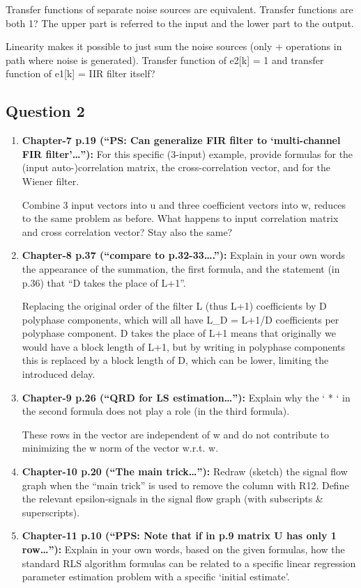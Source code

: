 \documentclass[
  a4paper,
  ,captions=tableheading
]{scrartcl}
\begin{document}
\begin{enumerate}
  Transfer functions of separate noise sources are equivalent. Transfer
  functions are both 1? The upper part is referred to the input and the
  lower part to the output.

  Linearity makes it possible to just sum the noise sources (only +
  operations in path where noise is generated). Transfer function of
  e2{[}k{]} = 1 and transfer function of e1{[}k{]} = IIR filter itself?
\end{enumerate}

\subsection{\texorpdfstring{\textbf{Question
2}}{Question 2}}\label{question-2}

\begin{enumerate}
\def\labelenumi{\arabic{enumi}.}
\item
  \textbf{Chapter-7 p.19 (``PS: Can generalize FIR filter to
  `multi-channel FIR filter'\ldots''):} For this specific (3-input)
  example, provide formulas for the (input auto-)correlation matrix, the
  cross-correlation vector, and for the Wiener filter.

  Combine 3 input vectors into u and three coefficient vectors into w,
  reduces to the same problem as before. What happens to input
  correlation matrix and cross correlation vector? Stay also the same?
\item
  \textbf{Chapter-8 p.37 (``compare to p.32-33\ldots.''):} Explain in
  your own words the appearance of the summation, the first formula, and
  the statement (in p.36) that ``D takes the place of L+1''.

  Replacing the original order of the filter L (thus L+1) coefficients
  by D polyphase components, which will all have L\_D = L+1/D
  coefficients per polyphase component. D takes the place of L+1 means
  that originally we would have a block length of L+1, but by writing in
  polyphase components this is replaced by a block length of D, which
  can be lower, limiting the introduced delay.
\item
  \textbf{Chapter-9 p.26 (``QRD for LS estimation\ldots''):} Explain why
  the ` * ` in the second formula does not play a role (in the third
  formula).

  These rows in the vector are independent of w and do not contribute to
  minimizing the w norm of the vector w.r.t. w.
\item
  \textbf{Chapter-10 p.20 (``The main trick\ldots''):} Redraw (sketch)
  the signal flow graph when the ``main trick'' is used to remove the
  column with R12. Define the relevant epsilon-signals in the signal
  flow graph (with subscripts \& superscripts).
\item
  \textbf{Chapter-11 p.10 (``PPS: Note that if in p.9 matrix U has only
  1 row\ldots''):} Explain in your own words, based on the given
  formulas, how the standard RLS algorithm formulas can be related to a
  specific linear regression parameter estimation problem with a
  specific `initial estimate'.


\end{enumerate}
\end{document}
